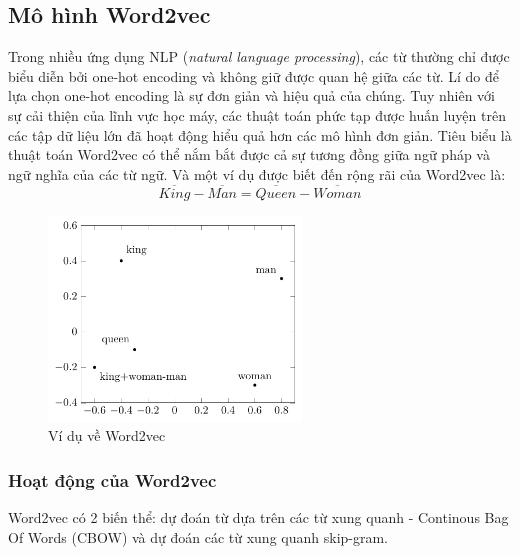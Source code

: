 \subsection{Mô hình Word2vec}
Trong nhiều ứng dụng NLP (\textit{natural language processing}), các từ thường chỉ được biểu diễn bởi one-hot encoding và không giữ được quan hệ giữa các từ. Lí do để lựa chọn one-hot encoding là sự đơn giản và hiệu quả của chúng. \cite{Aggarwal2022-xj} Tuy nhiên với sự cải thiện của lĩnh vực học máy, các thuật toán phức tạp được huấn luyện trên các tập dữ liệu lớn đã hoạt động hiểu quả hơn các mô hình đơn giản. Tiêu biểu là thuật toán Word2vec có thể nắm bắt được cả sự tương đồng giữa ngữ pháp và ngữ nghĩa của các từ ngữ. Và một ví dụ được biết đến rộng rãi của Word2vec là:
\[
    \overline{King}-\overline{Man}=\overline{Queen}-\overline{Woman}
\]

\begin{figure}[htb]
    \centering
    \includegraphics[width=0.6\textwidth]{tikz_image/word2vec_example.pdf}
    \caption{Ví dụ về Word2vec}
    \label{figure:word2vec-example}
\end{figure}

\subsubsection{Hoạt động của Word2vec}
Word2vec có 2 biến thể: dự đoán từ dựa trên các từ xung quanh - Continous Bag Of Words (CBOW) và dự đoán các từ xung quanh skip-gram.

